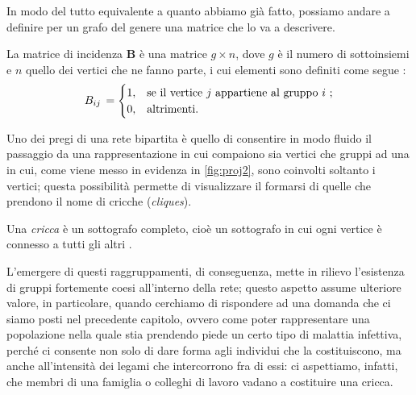 In modo del tutto equivalente a quanto abbiamo già fatto, possiamo andare a definire per un grafo del genere una matrice che lo va a descrivere.
\begin{definizione}
La matrice di incidenza \textbf{B} è una matrice $ g \times n $, dove $ g $ è il numero di sottoinsiemi e $ n $ quello dei vertici che ne fanno parte, i cui elementi sono definiti come segue \cite{Newman}:
\[
B_{ij} \, =
\begin{cases}
1, & \text{se il vertice $ j $ appartiene al gruppo $ i $ };\\
0, & \text{altrimenti}.
\end{cases}
\]
\end{definizione}

Uno dei pregi di una rete bipartita è quello di consentire in modo fluido il passaggio da una rappresentazione in cui compaiono sia vertici che gruppi ad una in cui, come viene messo in evidenza in \cref{fig:proj2}, sono coinvolti soltanto i vertici; questa possibilità permette di visualizzare il formarsi di quelle che prendono il nome di cricche (\emph{cliques}).
\begin{definizione} 
Una \emph{cricca} è un sottografo completo, cioè un sottografo in cui ogni vertice è connesso a tutti gli altri \cite{Bickle}.
\end{definizione}
L'emergere di questi raggruppamenti, di conseguenza, mette in rilievo l'esistenza di gruppi fortemente coesi all'interno della rete; questo aspetto assume ulteriore valore, in particolare, quando cerchiamo di rispondere ad una domanda che ci siamo posti nel precedente capitolo, ovvero come poter rappresentare una popolazione nella quale stia prendendo piede un certo tipo di malattia infettiva, perché ci consente non solo di dare forma agli individui che la costituiscono, ma anche all'intensità dei legami che intercorrono fra di essi: ci aspettiamo, infatti, che membri di una famiglia o colleghi di lavoro vadano a costituire una cricca. 

